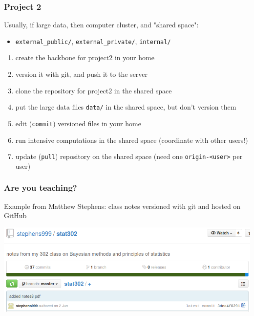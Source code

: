 \documentclass[c]{beamer} %
\begin{document}
\begin{frame}[fragile]
  \frametitle{Project 2}
  Usually, if large data, then computer cluster, and "shared space":
  \begin{itemize}
  \item \verb+external_public/+, \verb+external_private/+, \verb+internal/+
  \end{itemize}
  
  \bigskip
  \pause
  
  \begin{enumerate}
  \item create the backbone for project2 in your home
  \item version it with git, and push it to the server
  \item clone the repository for project2 in the shared space
  \item put the large data files \verb+data/+ in the shared space, but don't version them
  \item edit (\verb+commit+) versioned files in your home
  \item run intensive computations in the shared space (coordinate with other users!)
  \item update (\verb+pull+) repository on the shared space (need one \verb+origin-<user>+ per user)
  \end{enumerate}
\end{frame}

\begin{frame}
  \frametitle{Are you teaching?}
  Example from Matthew Stephens: class notes versioned with git and hosted on GitHub
  
  \bigskip
  
  \begin{center}
    \includegraphics[width=\textwidth,height=\textheight,keepaspectratio=true]{mstephens_stat302}%
  \end{center}
\end{frame}  
\end{document}
